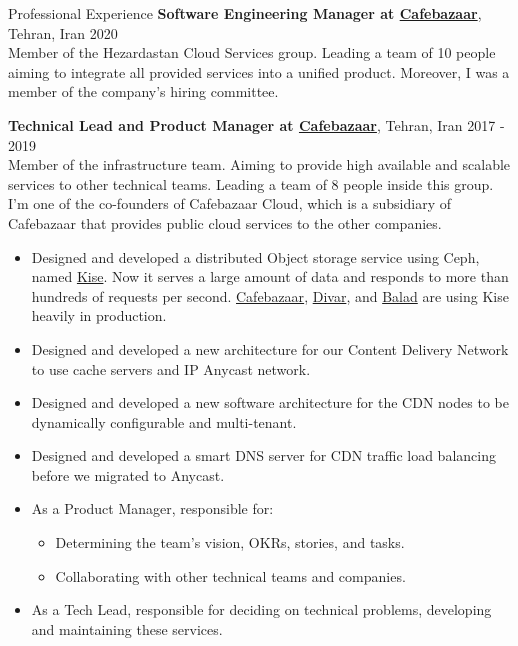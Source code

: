 \documentclass{resume} %
\begin{document}
\begin{rSection}{Professional Experience}
	{\bf Software Engineering Manager at \href{https://cafebazaar.ir/}{Cafebazaar}}, Tehran, Iran \hfill 2020
	\\ Member of the Hezardastan Cloud Services group. Leading a team of 10 people aiming to integrate all provided services into a unified product. Moreover, I was a member of the company's hiring committee.
	
	{\bf Technical Lead and Product Manager at \href{https://cafebazaar.ir/}{Cafebazaar}}, Tehran, Iran \hfill 2017 - 2019
	\\ Member of the infrastructure team. Aiming to provide high available and scalable services to other technical teams. Leading a team of 8 people inside this group. I'm one of the co-founders of Cafebazaar Cloud, which is a subsidiary of Cafebazaar that provides public cloud services to the other companies.
	\begin{itemize}
		\item Designed and developed a distributed Object storage service using Ceph, named \href{https://kise.roo.cloud/}{Kise}. Now it serves a large amount of data and responds to more than hundreds of requests per second. \href{https://cafebazaar.ir/}{Cafebazaar}, \href{https://divar.ir/}{Divar}, and \href{http://balad.ir/}{Balad} are using Kise heavily in production.
		\item Designed and developed a new architecture for our Content Delivery Network to use cache servers and IP Anycast network.
		\item Designed and developed a new software architecture for the CDN nodes to be dynamically configurable and multi-tenant.
		\item Designed and developed a smart DNS server for CDN traffic load balancing before we migrated to Anycast.
		\item As a Product Manager, responsible for:
		\begin{itemize}
			\item Determining the team's vision, OKRs, stories, and tasks.
			\item Collaborating with other technical teams and companies.
		\end{itemize}
		\item As a Tech Lead, responsible for deciding on technical problems, developing and maintaining these services.
	\end{itemize}
	

\end{rSection}
\end{document}
